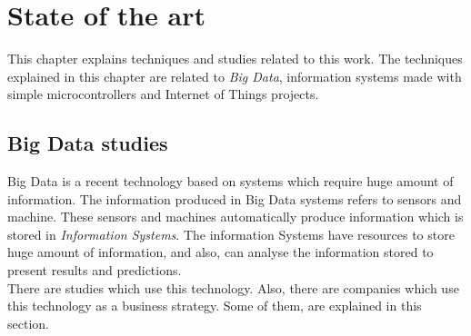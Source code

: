 
\chapter{State of the art}

This chapter explains techniques and studies related to this work. The techniques explained in this chapter are related to \textit{Big Data}, information systems made with simple microcontrollers and Internet of Things projects.\\

\section{Big Data studies}

Big Data is a recent technology based on systems which require huge amount of information. The information produced in Big Data systems refers to sensors and machine. These sensors and machines automatically produce information which is stored in \textit{Information Systems}. The information Systems have resources to store huge amount of information, and also, can analyse the information stored to present results and predictions.\\

There are studies which use this technology. Also, there are companies which use this technology as a business strategy. Some of them, are explained in this section.

